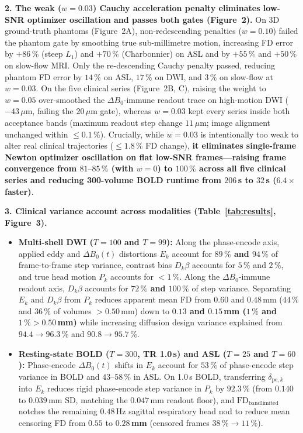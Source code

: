 \documentclass[11pt]{article}
\begin{document}
\textbf{2. The weak ($w = 0.03$) Cauchy acceleration penalty eliminates low-SNR optimizer oscillation and passes both gates (Figure~2).}
On 3D ground-truth phantoms (Figure~2A), non-redescending penalties ($w = 0.10$) failed the phantom gate by smoothing true sub-millimetre motion, increasing FD error by $+86\,\%$ (steep $L_1$) and $+70\,\%$ (Charbonnier) on ASL and by $+55\,\%$ and $+50\,\%$ on slow-flow MRI. Only the re-descending Cauchy penalty passed, reducing phantom FD error by $14\,\%$ on ASL, $17\,\%$ on DWI, and $3\,\%$ on slow-flow at $w = 0.03$. On the five clinical series (Figure~2B, C), raising the weight to $w = 0.05$ over-smoothed the $\Delta B_0$-immune readout trace on high-motion DWI ($-43\,\mu\text{m}$, failing the $20\,\mu\text{m}$ gate), whereas $w = 0.03$ kept every series inside both acceptance bands (maximum readout step change $11\,\mu\text{m}$; image alignment unchanged within $\le 0.1\,\%$). Crucially, while $w = 0.03$ is intentionally too weak to alter real clinical trajectories ($\le 1.8\,\%$ FD change), \textbf{it eliminates single-frame Newton optimizer oscillation on flat low-SNR frames—raising frame convergence from $81\text{--}85\,\%$ (with $w = 0$) to $100\,\%$ across all five clinical series and reducing 300-volume BOLD runtime from $206$\,s to $32$\,s ($6.4\times$ faster)}.

\textbf{3. Clinical variance account across modalities (Table~\ref{tab:results}, Figure~3).}
\begin{itemize}
\item \textbf{Multi-shell DWI ($T = 100$ and $T = 99$):} Along the phase-encode axis, applied eddy and $\Delta B_0(t)$ distortions $E_k$ account for \textbf{$89\,\%$ and $94\,\%$} of frame-to-frame step variance, contrast bias $D_k\beta$ accounts for $5\,\%$ and $2\,\%$, and true head motion $P_k$ accounts for $< 1\,\%$. Along the $\Delta B_0$-immune readout axis, $D_k\beta$ accounts for \textbf{$72\,\%$ and $100\,\%$} of step variance. Separating $E_k$ and $D_k\beta$ from $P_k$ reduces apparent mean FD from $0.60$ and $0.48$\,mm ($44\,\%$ and $36\,\%$ of volumes $> 0.50$\,mm) down to \textbf{$0.13$ and $0.15$\,mm ($1\,\%$ and $1\,\% > 0.50$\,mm)} while increasing diffusion design variance explained from $94.4 \to 96.3\,\%$ and $90.8 \to 95.7\,\%$.
\item \textbf{Resting-state BOLD ($T = 300$, TR 1.0\,s) and ASL ($T = 25$ and $T = 60$):} Phase-encode $\Delta B_0(t)$ shifts in $E_k$ account for \textbf{$53\,\%$} of phase-encode step variance in BOLD and \textbf{$43\text{--}58\,\%$} in ASL. On 1.0\,s BOLD, transferring $\delta_{\text{pe},k}$ into $E_k$ reduces rigid phase-encode step variance in $P_k$ by $92.3\,\%$ (from $0.140$ to $0.039$\,mm SD, matching the $0.047$\,mm readout floor), and $\text{FD}_{\text{bandlimited}}$ notches the remaining $0.48$\,Hz sagittal respiratory head nod to reduce mean censoring FD from $0.55$ to \textbf{$0.28$\,mm} (censored frames $38\,\% \to 11\,\%$).
\end{itemize}
\end{document}

